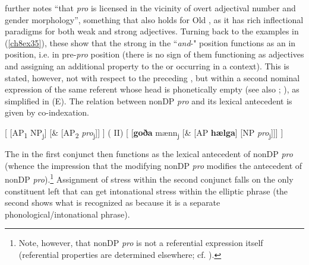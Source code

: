 \documentclass[output=paper,colorlinks,citecolor=brown]{langscibook}
\begin{document}
further notes ``that \emph{pro} is licensed in the vicinity of overt
adjectival number and gender  morphology'', something that also
holds for Old , as it has rich inflectional paradigms for both
weak and strong adjectives. Turning back to the examples in (\ref{ch8ex35}), these
show that the strong  in the  ``\emph{and}-"
position functions as an   in  position,
i.e. in pre-\emph{pro} position (there is no sign of them functioning
as  adjectives and assigning an additional property to the
 or occurring in a  context). This is stated, however,
not with respect to the preceding , but within a second nominal
expression of the same referent whose head is phonetically empty (see
also \citealp[244]{Spamer1979}; \citealp[71f]{Haumann03}), as simplified in (E). The
relation between nonDP \emph{pro} and its lexical antecedent is given by
co-indexation.

\begin{exe}
\label{ch8exe}
\begin{xlist}
\ex\label{ch8exea}{[} {[}AP\textsubscript{1} NP\textsubscript{j}{]} {[}\& {[}AP\textsubscript{2} \emph{pro}\textsubscript{j}{]}{]} {]} \hfill ( II)
\ex\label{ch8exeb}{[} {[}\textbf{goða} mænn\textsubscript{j} {[}\& {[}AP \textbf{hælga}{]} {[}NP \emph{pro}\textsubscript{j}{]}{]}{]} {]}
\end{xlist}
\end{exe}

\begin{sloppypar}
The  in the first conjunct then functions as the lexical antecedent
of nonDP \emph{pro} (whence the impression that the  
modifying nonDP \emph{pro} modifies the antecedent of nonDP
\emph{pro}).\footnote{Note, however, that nonDP \emph{pro} is not a
  referential expression itself (referential properties are determined
  elsewhere; cf. \citealp[76]{Haumann03}).} Assignment of stress within the
second conjunct falls on the only constituent left that can get
intonational stress within the elliptic phrase (the second 
shows what is recognized as  because it is a separate
phonological/intonational phrase).
\end{sloppypar}
\end{document}
